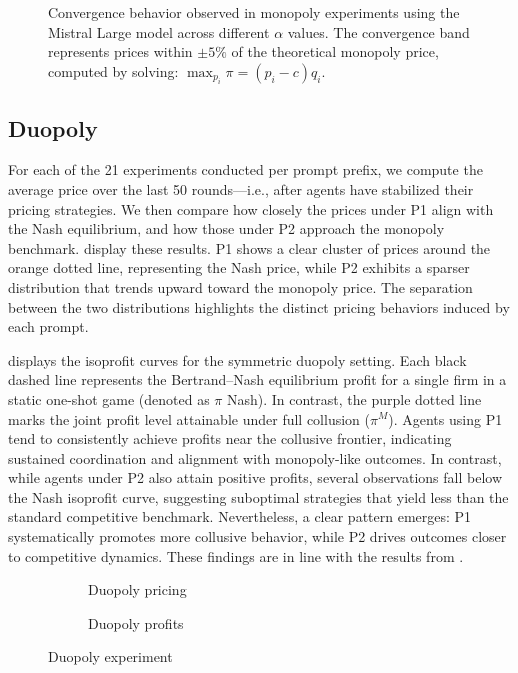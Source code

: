 \begin{figure}[H]
\centering

\caption{Convergence behavior observed in monopoly experiments using the Mistral Large model across different $\alpha$ values. The convergence band represents prices within $\pm 5\%$ of the theoretical monopoly price, computed by solving: $\max_{p_i} \pi = (p_i - c) q_i$.}
\label{fig:monopoly_convergence}
\end{figure}

\subsection*{Duopoly}

For each of the 21 experiments conducted per prompt prefix, we compute the average price over the last 50 rounds—i.e., after agents have stabilized their pricing strategies. We then compare how closely the prices under P1 align with the Nash equilibrium, and how those under P2 approach the monopoly benchmark.  display these results. P1 shows a clear cluster of prices around the orange dotted line, representing the Nash price, while P2 exhibits a sparser distribution that trends upward toward the monopoly price. The separation between the two distributions highlights the distinct pricing behaviors induced by each prompt.


 displays the isoprofit curves for the symmetric duopoly setting. Each black dashed line represents the Bertrand–Nash equilibrium profit for a single firm in a static one-shot game (denoted as $\pi$ Nash). In contrast, the purple dotted line marks the joint profit level attainable under full collusion ($\pi^M$). Agents using P1 tend to consistently achieve profits near the collusive frontier, indicating sustained coordination and alignment with monopoly-like outcomes. In contrast, while agents under P2 also attain positive profits, several observations fall below the Nash isoprofit curve, suggesting suboptimal strategies that yield less than the standard competitive benchmark. Nevertheless, a clear pattern emerges: P1 systematically promotes more collusive behavior, while P2 drives outcomes closer to competitive dynamics. These findings are in line with the results from \cite{fish_algorithmic_2025}.


\begin{figure}[H]
    \centering
    \begin{subfigure}[b]{0.475\linewidth}
    
    \caption{Duopoly pricing}
    \label{fig:duopoly_1}
    \end{subfigure}
    \hfill
    \begin{subfigure}[b]{0.475\linewidth}
    
    \caption{Duopoly profits}
    \label{fig:duopoly_2}
    \end{subfigure}
    \caption{Duopoly experiment}
    \label{fig:duopoly}
\end{figure}

